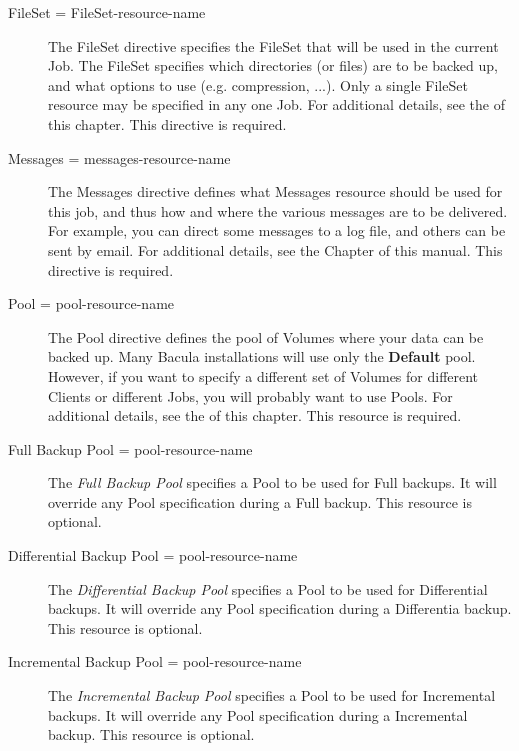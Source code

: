 \begin{description}
\item [FileSet = \lt{}FileSet-resource-name\gt{}]
   The FileSet directive  specifies the FileSet that will be used in the  current
   Job. The FileSet specifies which directories (or files)  are to be backed up,
   and what options to use (e.g. compression, ...).  Only a single FileSet
   resource may be specified in any one Job.  For additional details, see the  
    of this
   chapter. This directive is required. 

\item [Messages = \lt{}messages-resource-name\gt{}]
   The Messages directive  defines what Messages resource should be used for this
   job, and thus  how and where the various messages are to be delivered. For
   example,  you can direct some messages to a log file, and others can be  sent
   by email. For additional details, see the  
    Chapter of this 
   manual. This directive is required. 

\item [Pool = \lt{}pool-resource-name\gt{}]
   The Pool directive defines  the pool of Volumes where your data can be backed
   up. Many Bacula  installations will use only the {\bf Default} pool. However,
   if  you want to specify a different set of Volumes for different  Clients or
   different Jobs, you will probably want to use Pools.  For additional details,
   see the 
    of this chapter. This
   resource is required. 

\item [Full Backup Pool = \lt{}pool-resource-name\gt{}]
   The {\it Full Backup Pool} specifies a Pool to be used for  Full backups. It
   will override any Pool specification during a  Full backup. This resource is
   optional. 
   
\item [Differential Backup Pool = \lt{}pool-resource-name\gt{}]  
   The {\it Differential Backup Pool} specifies a Pool to be used for 
   Differential backups. It will override any Pool specification during a 
   Differentia backup. This resource is optional. 
   
\item [Incremental Backup Pool = \lt{}pool-resource-name\gt{}]  
   The {\it Incremental Backup Pool} specifies a Pool to be used for  Incremental
   backups. It will override any Pool specification during a  Incremental backup.
   This resource is optional. 


\end{description}
